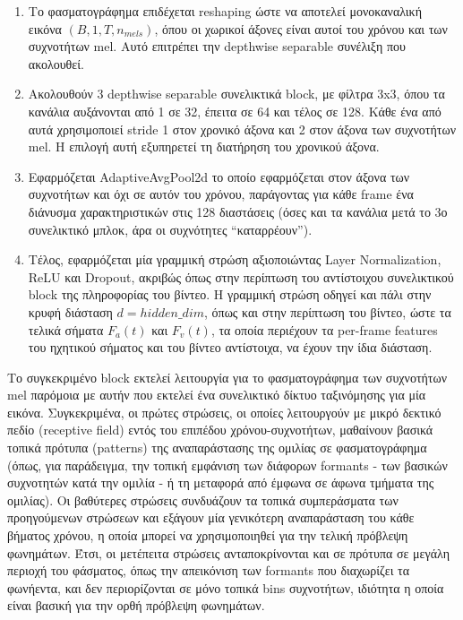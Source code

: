 \begin{enumerate}
\item Το φασματογράφημα επιδέχεται reshaping ώστε να αποτελεί μονοκαναλική εικόνα $(B,1,T,n_{mels})$, όπου οι χωρικοί άξονες είναι αυτοί του χρόνου και των συχνοτήτων mel. Αυτό επιτρέπει την depthwise separable συνέλιξη που ακολουθεί.

\item Ακολουθούν 3 depthwise separable συνελικτικά block, με φίλτρα 3x3, όπου τα κανάλια αυξάνονται από 1 σε 32, έπειτα σε 64 και τέλος σε 128. Κάθε ένα από αυτά χρησιμοποιεί stride 1 στον χρονικό άξονα και 2 στον άξονα των συχνοτήτων mel. Η επιλογή αυτή εξυπηρετεί τη διατήρηση του χρονικού άξονα.

\item Εφαρμόζεται AdaptiveAvgPool2d το οποίο εφαρμόζεται στον άξονα των συχνοτήτων και όχι σε αυτόν του χρόνου, παράγοντας για κάθε frame ένα διάνυσμα χαρακτηριστικών στις 128 διαστάσεις (όσες και τα κανάλια μετά το 3ο συνελικτικό μπλοκ, άρα οι συχνότητες ``καταρρέουν'').

\item Τέλος, εφαρμόζεται μία γραμμική στρώση αξιοποιώντας Layer Normalization, ReLU και Dropout, ακριβώς όπως στην περίπτωση του αντίστοιχου συνελικτικού block της πληροφορίας του βίντεο. Η γραμμική στρώση οδηγεί και πάλι στην κρυφή διάσταση $d = hidden\_dim$, όπως και στην περίπτωση του βίντεο, ώστε τα τελικά σήματα $F_a(t)$ και $F_v(t)$, τα οποία περιέχουν τα per-frame features του ηχητικού σήματος και του βίντεο αντίστοιχα, να έχουν την ίδια διάσταση.
\end{enumerate}

Το συγκεκριμένο block εκτελεί λειτουργία για το φασματογράφημα των συχνοτήτων mel παρόμοια με αυτήν που εκτελεί ένα συνελικτικό δίκτυο ταξινόμησης για μία εικόνα. Συγκεκριμένα, οι πρώτες στρώσεις, οι οποίες λειτουργούν με μικρό δεκτικό πεδίο (receptive field) εντός του επιπέδου χρόνου-συχνοτήτων, μαθαίνουν βασικά τοπικά πρότυπα (patterns) της αναπαράστασης της ομιλίας σε φασματογράφημα (όπως, για παράδειγμα, την τοπική εμφάνιση των διάφορων formants - των βασικών συχνοτητών κατά την ομιλία - ή τη μεταφορά από έμφωνα σε άφωνα τμήματα της ομιλίας). Οι βαθύτερες στρώσεις συνδυάζουν τα τοπικά συμπεράσματα των προηγούμενων στρώσεων και εξάγουν μία γενικότερη αναπαράσταση του κάθε βήματος χρόνου, η οποία μπορεί να χρησιμοποιηθεί για την τελική πρόβλεψη φωνημάτων. Έτσι, οι μετέπειτα στρώσεις ανταποκρίνονται και σε πρότυπα σε μεγάλη περιοχή του φάσματος, όπως την απεικόνιση των formants που διαχωρίζει τα φωνήεντα, και δεν περιορίζονται σε μόνο τοπικά bins συχνοτήτων, ιδιότητα η οποία είναι βασική για την ορθή πρόβλεψη φωνημάτων.

